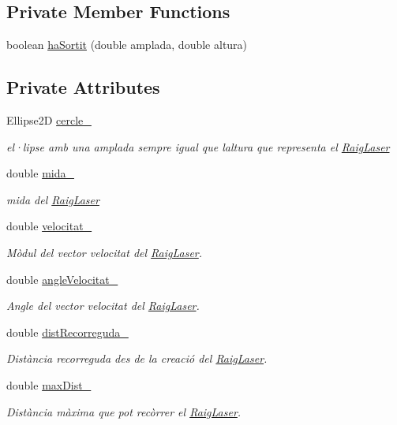 \subsection*{Private Member Functions}
\begin{DoxyCompactItemize}
\item 
boolean \hyperlink{class_raig_laser_a5789bd849e81d44087c74c909cdf03a0}{ha\+Sortit} (double amplada, double altura)
\end{DoxyCompactItemize}
\subsection*{Private Attributes}
\begin{DoxyCompactItemize}
\item 
Ellipse2\+D \hyperlink{class_raig_laser_a48b0b5a92a7424862bf6ebe59c498577}{cercle\+\_\+}
\begin{DoxyCompactList}\small\item\em el·lipse amb una amplada sempre igual que l\textquotesingle{}altura que representa el \hyperlink{class_raig_laser}{Raig\+Laser} \end{DoxyCompactList}\item 
double \hyperlink{class_raig_laser_ac18a272d02d6d090eebee561f05c1a0a}{mida\+\_\+}
\begin{DoxyCompactList}\small\item\em mida del \hyperlink{class_raig_laser}{Raig\+Laser} \end{DoxyCompactList}\item 
double \hyperlink{class_raig_laser_af4bf8a2a716caaa467e7a01ca1566924}{velocitat\+\_\+}
\begin{DoxyCompactList}\small\item\em Mòdul del vector velocitat del \hyperlink{class_raig_laser}{Raig\+Laser}. \end{DoxyCompactList}\item 
double \hyperlink{class_raig_laser_a2a0e32ff8599a77e2d1f315924c0da14}{angle\+Velocitat\+\_\+}
\begin{DoxyCompactList}\small\item\em Angle del vector velocitat del \hyperlink{class_raig_laser}{Raig\+Laser}. \end{DoxyCompactList}\item 
double \hyperlink{class_raig_laser_aecdc87070f24e6116db8f89d61d75b3a}{dist\+Recorreguda\+\_\+}
\begin{DoxyCompactList}\small\item\em Distància recorreguda des de la creació del \hyperlink{class_raig_laser}{Raig\+Laser}. \end{DoxyCompactList}\item 
double \hyperlink{class_raig_laser_a950579f9b8aec21d629287044a7a65e7}{max\+Dist\+\_\+}
\begin{DoxyCompactList}\small\item\em Distància màxima que pot recòrrer el \hyperlink{class_raig_laser}{Raig\+Laser}. \end{DoxyCompactList}\end{DoxyCompactItemize}


